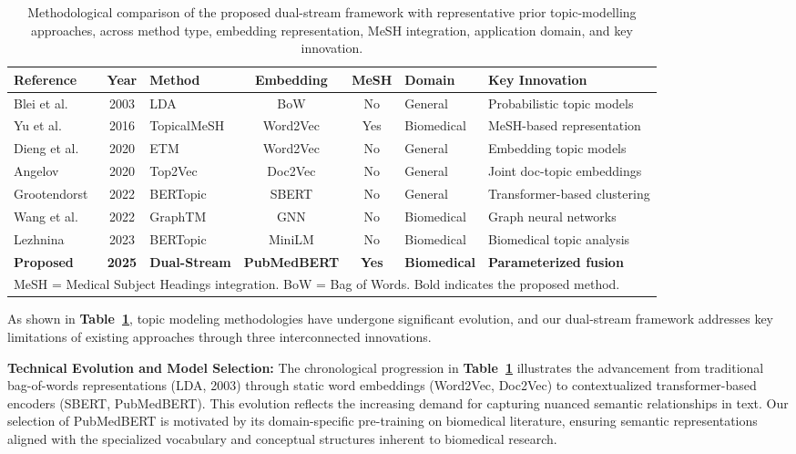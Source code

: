\documentclass[authorproof,JACIII,researchpaper]{fujipressarticle}
\begin{document}
\begin{table}[!t]
\centering
\caption{Methodological comparison of the proposed dual-stream framework with representative prior topic-modelling approaches, across method type, embedding representation, MeSH integration, application domain, and key innovation.}
\label{tab:comparison}
\renewcommand{\arraystretch}{1.3}
\begin{tabular}{lclccll}
\hline
\textbf{Reference} & \textbf{Year} & \textbf{Method} & \textbf{Embedding} & \textbf{MeSH} & \textbf{Domain} & \textbf{Key Innovation} \\
\hline
Blei et al.~\cite{blei_latent_2003} & 2003 & LDA & BoW & No & General & Probabilistic topic models \\
Yu et al.~\cite{yu_improving_2016} & 2016 & TopicalMeSH & Word2Vec & Yes & Biomedical & MeSH-based representation \\
Dieng et al.~\cite{dieng_topic_2020} & 2020 & ETM & Word2Vec & No & General & Embedding topic models \\
Angelov~\cite{angelov_top2vec_2020} & 2020 & Top2Vec & Doc2Vec & No & General & Joint doc-topic embeddings \\
Grootendorst~\cite{grootendorst_bertopic_2022} & 2022 & BERTopic & SBERT & No & General & Transformer-based clustering \\
Wang et al.~\cite{wang_graph-embedded_2022} & 2022 & GraphTM & GNN & No & Biomedical & Graph neural networks \\
Lezhnina~\cite{lezhnina_depression_2023} & 2023 & BERTopic & MiniLM & No & Biomedical & Biomedical topic analysis \\
\hline
\textbf{Proposed} & \textbf{2025} & \textbf{Dual-Stream} & \textbf{PubMedBERT} & \textbf{Yes} & \textbf{Biomedical} & \textbf{Parameterized fusion} \\
\hline
\multicolumn{7}{l}{\footnotesize MeSH = Medical Subject Headings integration. BoW = Bag of Words. Bold indicates the proposed method.} \\
\end{tabular}
\end{table}

As shown in \textbf{Table~\ref{tab:comparison}}, topic modeling methodologies have undergone significant evolution, and our dual-stream framework addresses key limitations of existing approaches through three interconnected innovations.

\textbf{Technical Evolution and Model Selection:} The chronological progression in \textbf{Table~\ref{tab:comparison}} illustrates the advancement from traditional bag-of-words representations (LDA, 2003) through static word embeddings (Word2Vec, Doc2Vec) to contextualized transformer-based encoders (SBERT, PubMedBERT). This evolution reflects the increasing demand for capturing nuanced semantic relationships in text. Our selection of PubMedBERT is motivated by its domain-specific pre-training on biomedical literature, ensuring semantic representations aligned with the specialized vocabulary and conceptual structures inherent to biomedical research.
\end{document}
